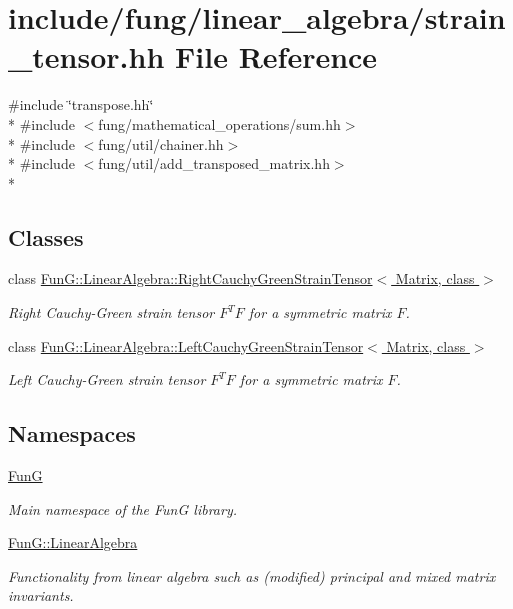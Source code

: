 \hypertarget{strain__tensor_8hh}{\section{include/fung/linear\-\_\-algebra/strain\-\_\-tensor.hh File Reference}
\label{strain__tensor_8hh}
}
{\ttfamily \#include \char`\"{}transpose.\-hh\char`\"{}}\\*
{\ttfamily \#include $<$fung/mathematical\-\_\-operations/sum.\-hh$>$}\\*
{\ttfamily \#include $<$fung/util/chainer.\-hh$>$}\\*
{\ttfamily \#include $<$fung/util/add\-\_\-transposed\-\_\-matrix.\-hh$>$}\\*
\subsection*{Classes}
\begin{DoxyCompactItemize}
\item 
class \hyperlink{classFunG_1_1LinearAlgebra_1_1RightCauchyGreenStrainTensor}{Fun\-G\-::\-Linear\-Algebra\-::\-Right\-Cauchy\-Green\-Strain\-Tensor$<$ Matrix, class $>$}
\begin{DoxyCompactList}\small\item\em Right Cauchy-\/\-Green strain tensor $ F^T F $ for a symmetric matrix $ F $. \end{DoxyCompactList}\item 
class \hyperlink{classFunG_1_1LinearAlgebra_1_1LeftCauchyGreenStrainTensor}{Fun\-G\-::\-Linear\-Algebra\-::\-Left\-Cauchy\-Green\-Strain\-Tensor$<$ Matrix, class $>$}
\begin{DoxyCompactList}\small\item\em Left Cauchy-\/\-Green strain tensor $ F^T F $ for a symmetric matrix $ F $. \end{DoxyCompactList}\end{DoxyCompactItemize}
\subsection*{Namespaces}
\begin{DoxyCompactItemize}
\item 
\hyperlink{namespaceFunG}{Fun\-G}
\begin{DoxyCompactList}\small\item\em Main namespace of the Fun\-G library. \end{DoxyCompactList}\item 
\hyperlink{namespaceFunG_1_1LinearAlgebra}{Fun\-G\-::\-Linear\-Algebra}
\begin{DoxyCompactList}\small\item\em Functionality from linear algebra such as (modified) principal and mixed matrix invariants. \end{DoxyCompactList}\end{DoxyCompactItemize}

